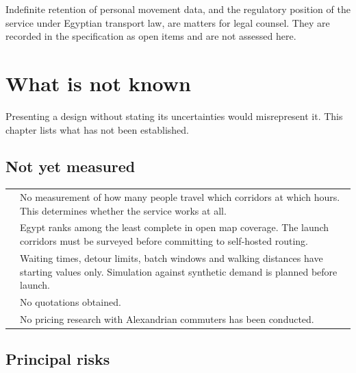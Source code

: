 \begin{notebox}
Indefinite retention of personal movement data, and the regulatory position of the service under
Egyptian transport law, are matters for legal counsel. They are recorded in the specification as
open items and are not assessed here.
\end{notebox}

\chapter{What is not known}

Presenting a design without stating its uncertainties would misrepresent it. This chapter lists what
has not been established.

\section{Not yet measured}

\begin{center}
\begin{tabularx}{\textwidth}{@{}L{46mm}Y@{}}
\toprule
{} & No measurement of how many people travel which corridors at which hours. This determines whether the service works at all. \\
 & Egypt ranks among the least complete in open map coverage. The launch corridors must be surveyed before committing to self-hosted routing. \\
 & Waiting times, detour limits, batch windows and walking distances have starting values only. Simulation against synthetic demand is planned before launch. \\
 & No quotations obtained. \\
 & No pricing research with Alexandrian commuters has been conducted. \\
\bottomrule
\end{tabularx}
\end{center}

\section{Principal risks}

